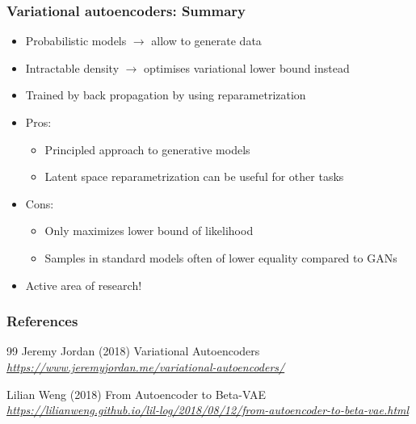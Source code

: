 \documentclass[11pt,compress,t,notes=noshow, xcolor=table]{beamer}
\begin{document}

\begin{frame}
\frametitle{Variational autoencoders: Summary}

\begin{itemize}
  \item Probabilistic models $\rightarrow$ allow to generate data
  \item Intractable density $\rightarrow$ optimises variational lower bound instead
  \item Trained by back propagation by using reparametrization
  \pause
  \item Pros:
    \begin{itemize}
      \item Principled approach to generative models
      \item Latent space reparametrization can be useful for other tasks
    \end{itemize}  
  \pause
  \item Cons:
    \begin{itemize}
      \item Only maximizes lower bound of likelihood
      \item Samples in standard models often of lower equality compared to GANs
    \end{itemize} 
  \item Active area of research!
\end{itemize}

\end{frame}




\begin{vbframe}
\frametitle{References}
\footnotesize{
\begin{thebibliography}{99}
 Jeremy Jordan (2018)
\newblock Variational Autoencoders
\newblock \emph{\url{https://www.jeremyjordan.me/variational-autoencoders/}}

 Lilian Weng (2018)
\newblock From Autoencoder to Beta-VAE
\newblock \emph{\url{https://lilianweng.github.io/lil-log/2018/08/12/from-autoencoder-to-beta-vae.html}}

\end{thebibliography}
}
\end{vbframe}
\end{document}
